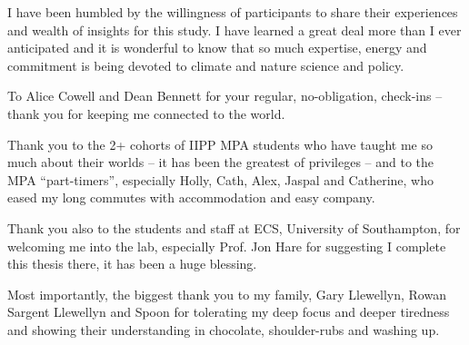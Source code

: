 \fi
\begin{acknowledgements}
I have been humbled by the willingness of participants to share their experiences and wealth of insights for this study. I have learned a great deal more than I ever anticipated and it is wonderful to know that so much expertise, energy and commitment is being devoted to climate and nature science and policy. 

To Alice Cowell and Dean Bennett for your regular, no-obligation, check-ins -- thank you for keeping me connected to the world.

Thank you to the 2+ cohorts of IIPP MPA students who have taught me so much about their worlds -- it has been the greatest of privileges -- and to the MPA ``part-timers'', especially Holly, Cath, Alex, Jaspal and Catherine, who eased my long commutes with accommodation and easy company.

Thank you also to the students and staff at ECS, University of Southampton, for welcoming me into the lab, especially Prof. Jon Hare for suggesting I complete this thesis there, it has been a huge blessing. %

Most importantly, the biggest thank you to my family, Gary Llewellyn, Rowan Sargent Llewellyn and Spoon for tolerating my deep focus and deeper tiredness and showing their understanding in chocolate, shoulder-rubs and washing up.
\end{acknowledgements}


\setcounter{tocdepth}{2} 

\tableofcontents
\listoffigures
\listoftables
%
\printglossary[title=List of Abbreviations,type=\acronymtype]
